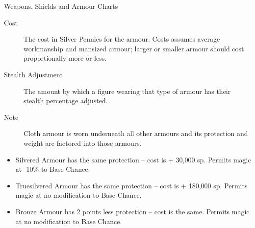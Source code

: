 \begin{Tables}{Weapons, Shields and Armour Charts}
\begin{description}
\item[Cost] The cost in Silver Pennies for the armour.  Costs assumes
  average workmanship and mansized armour; larger or smaller armour
  should cost proportionally more or less.

\item[Stealth Adjustment] The amount by which a figure wearing that
  type of armour has their stealth percentage adjusted.

\item[Note] Cloth armour is worn underneath all other armours and its
  protection and weight are factored into those armours.
\end{description}

\begin{itemize}
\item  Silvered Armour has the same protection – cost is + 30,000 sp.
Permits magic at -10\% to Base Chance.

\item  Truesilvered Armour has the same protection – cost is + 180,000
sp. Permits magic at no modification to Base Chance.

\item Bronze Armour has 2 points less protection – cost is the same.
Permits magic at no modification to Base Chance.
\end{itemize}

\end{Tables}
